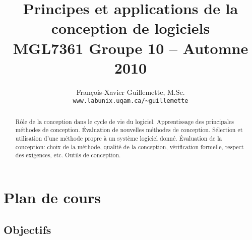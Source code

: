 \documentclass{article}
\begin{document}
\title{Principes et applications de la conception de logiciels\\\vspace{1cm}\Large MGL7361 Groupe 10 -- Automne 2010}
\author{François-Xavier Guillemette, M.Sc.\\\small\texttt{www.labunix.uqam.ca/\~{}guillemette}}
\maketitle

\begin{abstract}
Rôle de la conception dans le cycle de vie du logiciel. Apprentissage des principales méthodes de conception. Évaluation de nouvelles méthodes de conception. Sélection et utilisation d'une méthode propre à un système logiciel donné. Évaluation de la conception: choix de la méthode, qualité de la conception, vérification formelle, respect des exigences, etc. Outils de conception.
\nocite{brooksjr2010tdod, raymond1999cab, brooksjr1995mmm, mcconnell1996rdt, boudreau2007rcp, pressman2005sep, larman2001aua, fowler1999rid, gamma1995dpe, kaisler2005sp, hohmann2003bsa, beck2008ip, fowler2003poeaa, hohpe2003eip, steel2006csp, hunt1999ppj, mcconnell2004cc, thomas2001pr, richardson2007rws, laddad2003aap, weinberg1998pcp, cockburn2002asd, tulach2008pad, bloch2008ejp, martin2009cc, mcconnell2006software, odersky2008ps, beck2003test, evans2004domain, alexander1979timeless, crockford2008javascript, subramaniam2009ps, mitnick2002ad, crane2006aa, flanagan2005jn, konig2007ga, schmidt2006eir, norman2002design}
\end{abstract}

\pagebreak
\tableofcontents
\pagebreak

\section{Plan de cours}
\label{sec:plan_de_cours}

\subsection{Objectifs}
\label{sub:objectifs}
\end{document}
